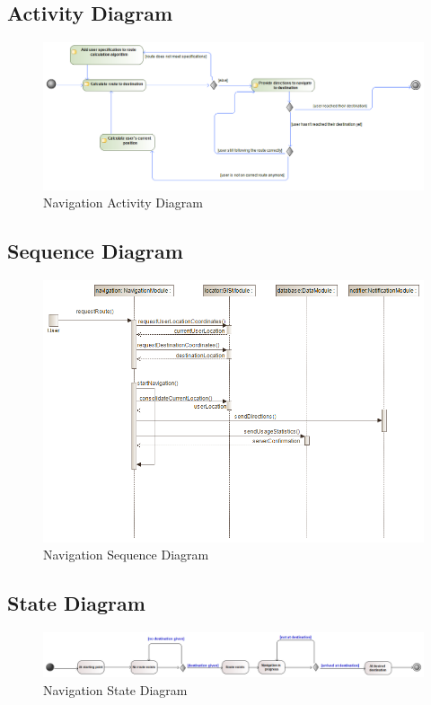 	\subsection{Activity Diagram}
	\begin{figure}[H]
	\includegraphics[width=\linewidth]{Navigation/NavigationModuleActivityDiagram.png}
	\caption{Navigation Activity Diagram}
	\label{fig:UML2}
	\end{figure}
	
	\subsection{Sequence Diagram}
	\begin{figure}[H]
	\includegraphics[scale=0.44]{Navigation/NavigationModuleSequenceDiagram.png}
	\caption{Navigation Sequence Diagram}
	\label{fig:UML5}
	\end{figure}
	
	\subsection{State Diagram}
	\begin{figure}[H]
	\includegraphics[width=\linewidth]{Navigation/NavigationModuleStateDiagram.png}
	\caption{Navigation State Diagram}
	\label{fig:UML3}
	\end{figure}
	
